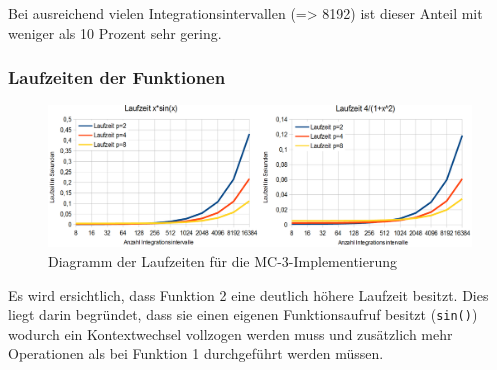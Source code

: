 \documentclass[a4paper,12pt]{scrartcl}
\begin{document}
Bei ausreichend vielen Integrationsintervallen (=> 8192) ist dieser Anteil mit weniger als 10 Prozent sehr gering.

\clearpage
\subsubsection{Laufzeiten der Funktionen}
\begin{figure}[htb]
  \begin{center}
    \includegraphics[width=1\hsize]{../mc3_laufzeit.png}
  \end{center}
  \caption{\label{mc3genauigkeit}
    Diagramm der Laufzeiten f\"ur die MC-3-Implementierung}
\end{figure}
Es wird ersichtlich, dass Funktion 2 eine deutlich h\"ohere Laufzeit besitzt. Dies liegt darin begr\"undet, dass sie einen eigenen Funktionsaufruf
besitzt (\texttt{sin()}) wodurch ein Kontextwechsel vollzogen werden muss und zus\"atzlich mehr Operationen als bei Funktion 1 durchgef\"uhrt werden m\"ussen.

\end{document}

